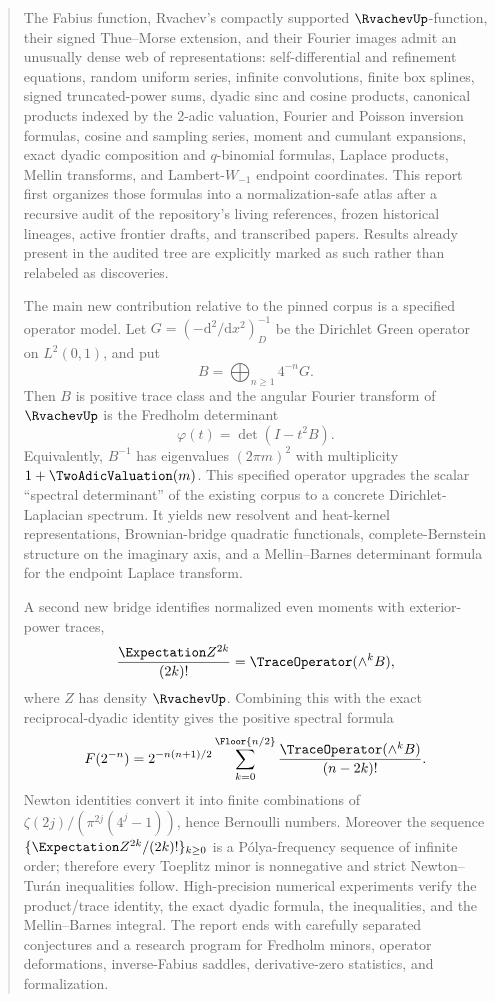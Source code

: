 \documentclass[11pt]{article}
\theoremstyle{definition}
\theoremstyle{remark}
\newcommand{\phiF}{\varphi}
\begin{document}
\begin{abstract}
The Fabius function, Rvachev's compactly supported \(\RvachevUp\)-function, their signed
Thue--Morse extension, and their Fourier images admit an unusually dense web of
representations: self-differential and refinement equations, random uniform series,
infinite convolutions, finite box splines, signed truncated-power sums, dyadic sinc and
cosine products, canonical products indexed by the 2-adic valuation, Fourier and
Poisson inversion formulas, cosine and sampling series, moment and cumulant
expansions, exact dyadic composition and \(q\)-binomial formulas, Laplace products,
Mellin transforms, and Lambert-\(W_{-1}\) endpoint coordinates.  This report first
organizes those formulas into a normalization-safe atlas after a recursive audit of the
repository's living references, frozen historical lineages, active frontier drafts, and
transcribed papers.  Results already present in the audited tree are explicitly marked
as such rather than relabeled as discoveries.

The main new contribution relative to the pinned corpus is a specified operator model.
Let \(G=(-\mathrm d^2/\mathrm dx^2)_D^{-1}\) be the Dirichlet Green operator on
\(L^2(0,1)\), and put
\[
 B=\bigoplus_{n\ge1}4^{-n}G.
\]
Then \(B\) is positive trace class and the angular Fourier transform of \(\RvachevUp\) is the
Fredholm determinant
\[
 \phiF(t)=\det(I-t^2B).
\]
Equivalently, \(B^{-1}\) has eigenvalues \((2\pi m)^2\) with multiplicity
\(1+\TwoAdicValuation(m)\).  This specified operator upgrades the scalar ``spectral determinant''
of the existing corpus to a concrete Dirichlet-Laplacian spectrum.  It yields new
resolvent and heat-kernel representations, Brownian-bridge quadratic functionals,
complete-Bernstein structure on the imaginary axis, and a Mellin--Barnes determinant
formula for the endpoint Laplace transform.

A second new bridge identifies normalized even moments with exterior-power traces,
\[
 \frac{\Expectation Z^{2k}}{(2k)!}=\TraceOperator(\wedge^kB),
\]
where \(Z\) has density \(\RvachevUp\).  Combining this with the exact reciprocal-dyadic
identity gives the positive spectral formula
\[
 F(2^{-n})=2^{-n(n+1)/2}
 \sum_{k=0}^{\Floor{n/2}}
 \frac{\TraceOperator(\wedge^kB)}{(n-2k)!}.
\]
Newton identities convert it into finite combinations of
\(\zeta(2j)/(\pi^{2j}(4^j-1))\), hence Bernoulli numbers.  Moreover the sequence
\(\{\Expectation Z^{2k}/(2k)!\}_{k\ge0}\) is a P\'olya-frequency sequence of infinite order;
therefore every Toeplitz minor is nonnegative and strict Newton--Tur\'an inequalities
follow.  High-precision numerical experiments verify the product/trace identity, the
exact dyadic formula, the inequalities, and the Mellin--Barnes integral.  The report
ends with carefully separated conjectures and a research program for Fredholm minors,
operator deformations, inverse-Fabius saddles, derivative-zero statistics, and
formalization.
\end{abstract}
\end{document}
